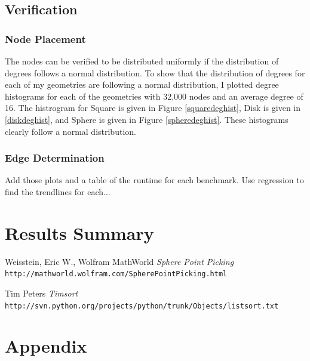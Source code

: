 \documentclass{article}
\begin{document}
    \subsection{Verification}

        \subsubsection{Node Placement}
        The nodes can be verified to be distributed uniformly if the distribution of degrees follows a normal distribution. To show that the distribution of degrees for each of my geometries are following a normal distribution, I plotted degree histograms for each of the geometries with 32,000 nodes and an average degree of 16. The histrogram for Square is given in Figure \ref{squaredeghist}, Disk is given in \ref{diskdeghist}, and Sphere is given in Figure \ref{spheredeghist}. These histograms clearly follow a normal distribution.

        \subsubsection{Edge Determination}
        Add those plots and a table of the runtime for each benchmark. Use regression to find the trendlines for each...

\section{Results Summary}

\newpage

\begin{thebibliography}{10}
    Weisstein, Eric W., Wolfram MathWorld
    \textit{Sphere Point Picking}
    \texttt{http://mathworld.wolfram.com/SpherePointPicking.html}

    Tim Peters
    \textit{Timsort}
    \texttt{http://svn.python.org/projects/python/trunk/Objects/listsort.txt}

\end{thebibliography}

\newpage

\section{Appendix}
\end{document}
